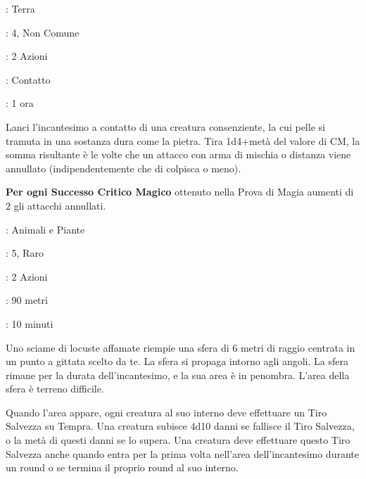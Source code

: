 \begin{multicols}{2}
\noindent\colorbox{OBSSgold!10}{
\begin{minipage}{0.95\linewidth}
\begin{description}[noitemsep, topsep=0pt, parsep=0pt, partopsep=0pt, leftmargin=0cm, labelwidth=1.3cm]
	\item[\textbf{Lista}]: Terra
	\item[\textbf{Livello}]: 4, Non Comune
	\item[\textbf{Lancio}]: 2 Azioni
	\item[\textbf{Gittata}]: Contatto
	\item[\textbf{Durata}]: 1 ora
\end{description}
\end{minipage}}\smallskip

Lanci l'incantesimo a contatto di una creatura consenziente, la cui pelle si tramuta in una sostanza dura come la pietra. Tira 1d4+metà del valore di CM, la somma risultante è le volte che un attacco con arma di mischia o distanza viene annullato (indipendentemente che di colpisca o meno).

\textbf{Per ogni Successo Critico Magico} ottenuto nella Prova di Magia aumenti di 2 gli attacchi annullati.

\noindent\colorbox{OBSSgold!10}{
\begin{minipage}{0.95\linewidth}
\begin{description}[noitemsep, topsep=0pt, parsep=0pt, partopsep=0pt, leftmargin=0cm, labelwidth=1.3cm]
	\item[\textbf{Lista}]: Animali e Piante
	\item[\textbf{Livello}]: 5, Raro
	\item[\textbf{Lancio}]: 2 Azioni
	\item[\textbf{Gittata}]: 90 metri
	\item[\textbf{Durata}]: 10 minuti
\end{description}
\end{minipage}}\smallskip

Uno sciame di locuste affamate riempie una sfera di 6 metri di raggio centrata in un punto a gittata scelto da te. La sfera si propaga intorno agli angoli. La sfera rimane per la durata dell'incantesimo, e la sua area è in penombra. L'area della sfera è terreno difficile.

Quando l'area appare, ogni creatura al suo interno deve effettuare un Tiro Salvezza su Tempra. Una creatura subisce 4d10 danni se fallisce il Tiro Salvezza, o la metà di questi danni se lo supera. Una creatura deve effettuare questo Tiro Salvezza anche quando entra per la prima volta nell'area dell'incantesimo durante un round o se termina il proprio round al suo interno.


\end{multicols}
